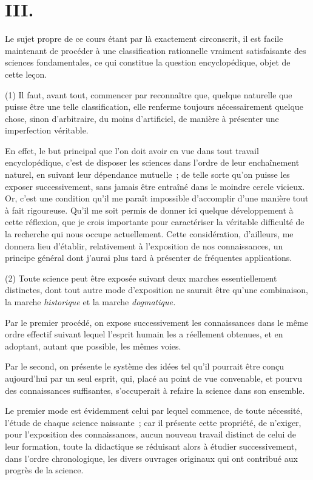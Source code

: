 \documentclass[french,twoside]{book} %
\begin{document}
\section[{III.}]{III.}
\noindent Le sujet propre de ce cours étant par là exactement circonscrit, il est facile maintenant de procéder à une classification rationnelle vraiment satisfaisante des sciences fondamentales, ce qui constitue la question encyclopédique, objet de cette leçon.\par
(1) Il faut, avant tout, commencer par reconnaître que, quelque naturelle que puisse être une telle classification, elle renferme toujours nécessairement quelque chose, sinon d’arbitraire, du moins d’artificiel, de manière à présenter une imperfection véritable.\par
En effet, le but principal que l’on doit avoir en vue dans tout travail encyclopédique, c’est de disposer les sciences dans l’ordre de leur enchaînement naturel, en suivant leur dépendance mutuelle ; de telle sorte qu’on puisse les exposer successivement, sans jamais être entraîné dans le moindre cercle vicieux. Or, c’est une condition qu’il me paraît impossible d’accomplir d’une manière tout à fait rigoureuse. Qu’il me soit permis de donner ici quelque développement à cette réflexion, que je crois importante pour caractériser la véritable difficulté de la recherche qui nous occupe actuellement. Cette considération, d’ailleurs, me donnera lieu d’établir, relativement à l’exposition de nos connaissances, un principe général dont j’aurai plus tard à présenter de fréquentes applications.\par
(2) Toute science peut être exposée suivant deux marches essentiellement distinctes, dont tout autre mode d’exposition ne saurait être qu’une combinaison, la marche {\itshape historique} et la marche {\itshape dogmatique.}\par
Par le premier procédé, on expose successivement les connaissances dans le même ordre effectif suivant lequel l’esprit humain les a réellement obtenues, et en adoptant, autant que possible, les mêmes voies.\par
Par le second, on présente le système des idées tel qu’il pourrait être conçu aujourd’hui par un seul esprit, qui, placé au point de vue convenable, et pourvu des connaissances suffisantes, s’occuperait à refaire la science dans son ensemble.\par
Le premier mode est évidemment celui par lequel commence, de toute nécessité, l’étude de chaque science naissante ; car il présente cette propriété, de n’exiger, pour l’exposition des connaissances, aucun nouveau travail distinct de celui de leur formation, toute la didactique se réduisant alors à étudier successivement, dans l’ordre chronologique, les divers ouvrages originaux qui ont contribué aux progrès de la science.\par
\end{document}
